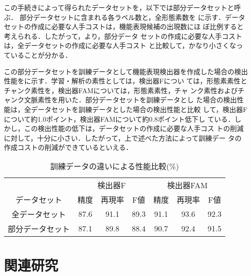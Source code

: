\documentclass[japanese]{jnlp_1.2d}
\newcommand{\tabref}[1]{}
\begin{document}
この手続きによって得られたデータセットを，以下では部分データセットと呼ぶ．
部分データセットに含まれる各ラベル数と，全形態素数を\tabref{tab:dataset} 
に示す．データセットの作成に必要な人手コストは，機能表現候補の出現数にほ
ぼ比例すると考えられる．したがって，\tabref{tab:dataset}より，部分データ
セットの作成に必要な人手コストは，全データセットの作成に必要な人手コスト
と比較して，かなり小さくなっていることが分かる．

この部分データセットを訓練データとして機能表現検出器を作成した場合の検出
性能を\tabref{tab:cost_F}に示す．学習・解析の素性としては，検出器Fについ
ては，形態素素性とチャンク素性を，検出器FAMについては，形態素素性，チャ
ンク素性およびチャンク文脈素性を用いた．部分データセットを訓練データとし
た場合の検出性能は，全データセットを訓練データとした場合の検出性能と比較
して，検出器Fについて約1.0ポイント，検出器FAMについて約0.8ポイント低下し
ている．しかし，この検出性能の低下は，データセットの作成に必要な人手コス
トの削減に対して，十分に小さい．したがって，上で述べた方法によって訓練デー
タの作成コストの削減ができているといえる．

\begin{table}
  \begin{center}
    \caption{訓練データの違いによる性能比較(\%)}
    \label{tab:cost_F}
    \begin{tabular}{c||c|c|c|c|c|c}
      \hline
      & \multicolumn{3}{c|}{検出器F} & \multicolumn{3}{c}{検出器FAM} \\ \cline{2-7}
      データセット & 精度 & 再現率 & F値 & 精度 & 再現率 & F値 \\
      \hline
      \hline
      全データセット & 87.6 & 91.1 & 89.3 & 91.1 & 93.6 & 92.3 \\
      部分データセット & 87.1 & 89.8 & 88.4 & 90.7 & 92.4 & 91.5 \\
      \hline
    \end{tabular}
  \end{center}
\vspace{11pt}
\end{table}


\section{関連研究}
\label{sec:関連研究}
\end{document}
